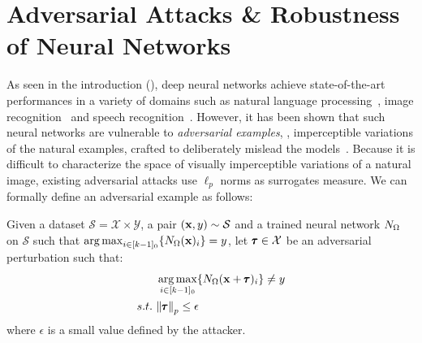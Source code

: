 %
%





\section{Adversarial Attacks \& Robustness of Neural Networks}
\label{section:ch2-preliminaries_on_adversarial_attacks}

As seen in the introduction (), deep neural networks achieve state-of-the-art performances in a variety of domains such as natural language processing~\cite{radford2018Language}, image recognition~\cite{he2016deep} and speech recognition~\cite{hinton2012deep}.
However, it has been shown that such neural networks are vulnerable to \emph{adversarial examples}, \ie, imperceptible variations of the natural examples, crafted to deliberately mislead the models~\cite{globerson2006nightmare,biggio2013evasion,szegedy2013intriguing}.
Because it is difficult to characterize the space of visually imperceptible variations of a natural image, existing adversarial attacks use $\ell_p$ norms as surrogates measure.
We can formally define an adversarial example as follows:
\begin{definition}
  Given a dataset $\mathcal{S} = \mathcal{X} \times \mathcal{Y}$, a pair $(\mathbf{x}, y) \sim \mathcal{S}$ and a trained neural network $N_\Omega$ on $\mathcal{S}$ such that $\operatorname*{arg\,max}_{i \in [k-1]_0} \{ N_\Omega(\mathbf{x})_i \} = y$, let $\pmb{\tau} \in \mathcal{X}$ be an adversarial perturbation such that:
  \begin{align}
    &\operatorname*{arg\,max}_{i \in [k-1]_0} \{ N_\Omega (\mathbf{x} + \pmb{\tau})_i \} \neq y \\
    s.t.\ &\norm{\pmb{\tau}}_p \leq \epsilon \notag
  \end{align}
  where $\epsilon$ is a small value defined by the attacker. 
\end{definition}

